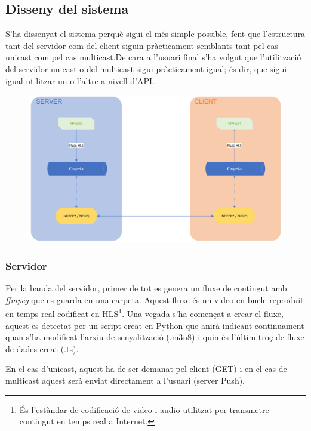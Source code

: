 \subsection{Disseny del sistema}
{
    S'ha dissenyat el sistema perquè sigui el més simple possible, fent que l'estructura tant del servidor com
    del client siguin pràcticament semblants tant pel cas unicast com pel cas multicast.De cara a l'usuari final
    s'ha volgut que l'utilització del servidor unicast o del multicast sigui pràcticament igual; és dir, que 
    sigui igual utilitzar un o l'altre a nivell d'\ac{API}. 

    \begin{figure}[H]
        \label{fig:system}
        \centering
        \includegraphics[width=15cm]{img/03_metodologia/system_design.png}
    \end{figure}
}
\subsubsection{Servidor}
{
    Per la banda del servidor, primer de tot es genera un fluxe de contingut amb \textit{ffmpeg} que es guarda en una 
    carpeta. Aquest fluxe és un video en bucle reproduit en temps real codificat en \ac{HLS}\footnote{És l'estàndar de
    codificació de video i audio utilitzat per transmetre contingut en temps real a Internet.}. Una vegada s'ha començat
    a crear el fluxe, aquest es detectat per un script creat en Python que anirà indicant continuament quan s'ha modificat
    l'arxiu de senyalització (.m3u8) i quin és l'últim troç de fluxe de dades creat (.ts).

    En el cas d'unicast, aquest ha de ser demanat pel client (GET) i en el cas de multicast aquest serà enviat directament
    a l'usuari (server Push).
}

